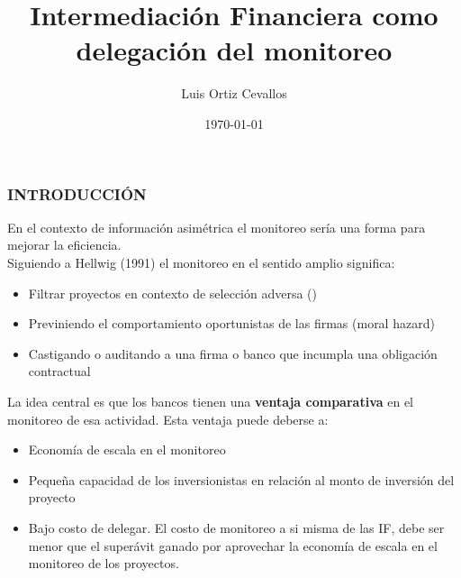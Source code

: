 \documentclass[10pt, xcolor=table, x11names]{beamer}
\title[]{Intermediación Financiera como delegación del monitoreo}
\author[Luis Ortiz]{Luis Ortiz Cevallos}
\institute[SECMCA]{\bf SECMCA}
\date[\today]{\footnotesize \today}
\begin{document}
\begin{frame}
\titlepage
\end{frame}




\begin{frame}
	\frametitle{{\normalsize INTRODUCCIÓN} {}}
En el contexto de información asimétrica el monitoreo sería una forma para mejorar la eficiencia.\\
Siguiendo a Hellwig (1991) el monitoreo en el sentido amplio significa:
\begin{itemize}
    \item Filtrar proyectos en contexto de selección adversa (\cite{Broecker1990}) 
    \item Previniendo el comportamiento oportunistas de las firmas (moral hazard) \cite{Tirole1997} 
    \item Castigando o auditando a una firma o banco que incumpla una obligación contractual \cite{Diamond1984}
\end{itemize}    
  
La idea central es que los bancos tienen una \textbf{ventaja comparativa} en el monitoreo de esa actividad. Esta ventaja puede deberse a:
\begin{itemize}
    \item Economía de escala en el monitoreo\\
    \item Pequeña capacidad de los inversionistas en relación al monto de inversión del proyecto
    \item Bajo costo de delegar. El costo de monitoreo a si misma de las IF, debe ser menor que el superávit ganado por aprovechar la economía de escala en el monitoreo de los proyectos.
\end{itemize} 

\end{frame}
\end{document}
